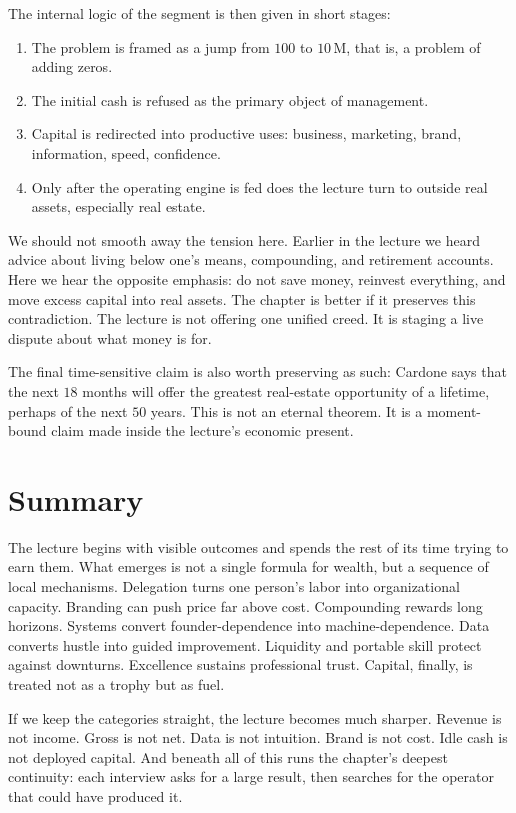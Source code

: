 The internal logic of the segment is then given in short stages:
\begin{enumerate}
\item The problem is framed as a jump from \(100\) to \(10\,\mathrm{M}\), that is, a problem of adding zeros.
\item The initial cash is refused as the primary object of management.
\item Capital is redirected into productive uses: business, marketing, brand, information, speed, confidence.
\item Only after the operating engine is fed does the lecture turn to outside real assets, especially real estate.
\end{enumerate}

We should not smooth away the tension here. Earlier in the lecture we heard advice about living below one's means, compounding, and retirement accounts. Here we hear the opposite emphasis: do not save money, reinvest everything, and move excess capital into real assets. The chapter is better if it preserves this contradiction. The lecture is not offering one unified creed. It is staging a live dispute about what money is for.

The final time-sensitive claim is also worth preserving as such: Cardone says that the next \(18\) months will offer the greatest real-estate opportunity of a lifetime, perhaps of the next \(50\) years. This is not an eternal theorem. It is a moment-bound claim made inside the lecture's economic present.

\section{Summary}

The lecture begins with visible outcomes and spends the rest of its time trying to earn them. What emerges is not a single formula for wealth, but a sequence of local mechanisms. Delegation turns one person's labor into organizational capacity. Branding can push price far above cost. Compounding rewards long horizons. Systems convert founder-dependence into machine-dependence. Data converts hustle into guided improvement. Liquidity and portable skill protect against downturns. Excellence sustains professional trust. Capital, finally, is treated not as a trophy but as fuel.

If we keep the categories straight, the lecture becomes much sharper. Revenue is not income. Gross is not net. Data is not intuition. Brand is not cost. Idle cash is not deployed capital. And beneath all of this runs the chapter's deepest continuity: each interview asks for a large result, then searches for the operator that could have produced it.